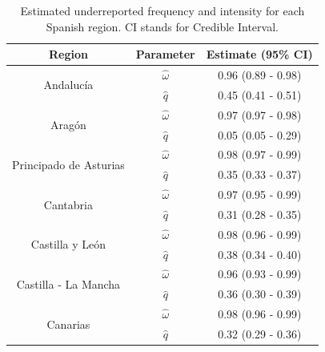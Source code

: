 \documentclass[twoside]{report}
\begin{document}
\begin{table}[!ht]\centering
\caption{\label{morina:tab1} Estimated underreported frequency and intensity for each Spanish region. CI stands for Credible Interval.}
\medskip
\begin{tabular}{ccc}
\toprule[0.09 em]
Region & Parameter & Estimate (95\% CI) \\
\midrule
\multirow{2}{*}{Andaluc\'ia}  & $\hat{\omega}$  & 0.96 (0.89 - 0.98) \\
                              & $\hat{q}$       & 0.45 (0.41 - 0.51) \\
\cmidrule{1-3}
\multirow{2}{*}{Arag\'on}    & $\hat{\omega}$  & 0.97 (0.97 - 0.98) \\
                             & $\hat{q}$       & 0.05 (0.05 - 0.29) \\
\cmidrule{1-3}
\multirow{2}{*}{Principado de Asturias}    & $\hat{\omega}$  & 0.98 (0.97 - 0.99) \\
                                           & $\hat{q}$       & 0.35 (0.33 - 0.37) \\
\cmidrule{1-3}
\multirow{2}{*}{Cantabria}    & $\hat{\omega}$  & 0.97 (0.95 - 0.99) \\
                              & $\hat{q}$       & 0.31 (0.28 - 0.35) \\
\cmidrule{1-3}
\multirow{2}{*}{Castilla y Le\'on}    & $\hat{\omega}$  & 0.98 (0.96 - 0.99) \\
                                      & $\hat{q}$       & 0.38 (0.34 - 0.40) \\
\cmidrule{1-3}
\multirow{2}{*}{Castilla - La Mancha}    & $\hat{\omega}$  & 0.96 (0.93 - 0.99) \\
                                         & $\hat{q}$       & 0.36 (0.30 - 0.39) \\
\cmidrule{1-3}
\multirow{2}{*}{Canarias}    & $\hat{\omega}$  & 0.98 (0.96 - 0.99) \\
                             & $\hat{q}$       & 0.32 (0.29 - 0.36) \\

\end{tabular}
\end{table}
\end{document}
